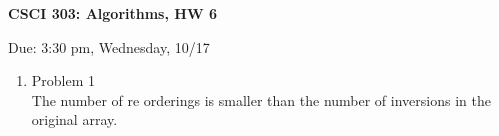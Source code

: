 \documentclass[11pt]{article}
\begin{document}
\begin{LARGE}
\centerline {\bf CSCI 303: Algorithms, HW 6}
\end{LARGE}
\vskip 0.25cm
\centerline{Due: 3:30 pm, Wednesday, 10/17}

\begin{enumerate}
\item Problem 1\\

The number of re orderings is smaller than the number of inversions in the original array.
\end{enumerate}
\end{document}
